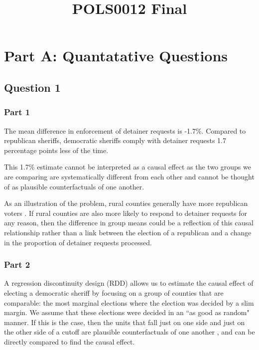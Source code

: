 \documentclass{article}\usepackage[]{graphicx}\usepackage[]{color}
\title{POLS0012 Final}
\author{}
\renewcommand\maketitle{}
\begin{document}
\maketitle



\section{Part A: Quantatative Questions}
\subsection{Question 1}


\subsubsection{Part 1}


The mean difference in enforcement of detainer requests is -1.7\%.
Compared to republican sheriffs, democratic sheriffs comply with detainer requests 1.7 percentage points less of the time.

This 1.7\% estimate cannot be interpreted as a causal effect as the two groups we are comparing are systematically different from each other and cannot be thought of as plausible counterfactuals of one another.

As an illustration of the problem, rural counties generally have more republican voters \parencite[][]{Gimpel_2020}.
If rural counties are also more likely to respond to detainer requests for any reason, then the difference in group means could be a reflection of this causal relationship rather than a link between the election of a republican and a change in the proportion of detainer requests processed.

\subsubsection{Part 2}
A regression discontinuity design (RDD) allows us to estimate the causal effect of electing a democratic sheriff by focusing on a group of counties that are comparable: the most marginal elections where the election was decided by a slim margin.
We assume that these elections were decided in an ``as good as random" manner. If this is the case, then the units that fall just on one side and just on the other side of a cutoff are plausible counterfactuals of one another \parencite[][]{McCrary_2008}, and can be directly compared to find the causal effect.
\end{document}
